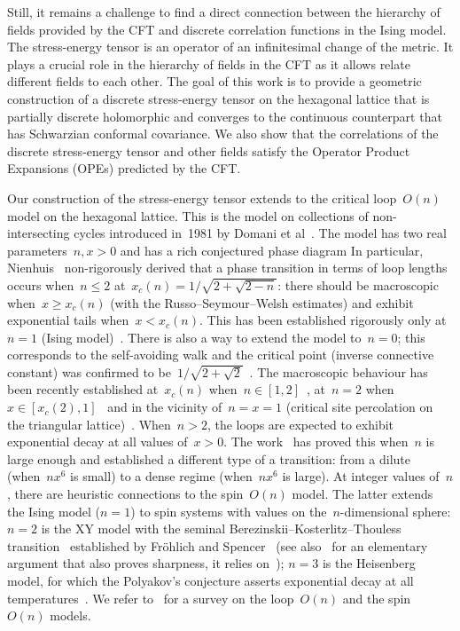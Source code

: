 \documentclass[reqno,11pt,a4paper]{amsart}
\theoremstyle{remark}
\begin{document}
Still, it remains a challenge to find a direct connection between the hierarchy of fields provided by the CFT and discrete correlation functions in the Ising model. The stress-energy tensor is an operator of an infinitesimal change of the metric. It plays a crucial role in the hierarchy of fields in the CFT as it allows relate different fields to each other. The goal of this work is to provide a geometric construction of a discrete stress-energy tensor on the hexagonal lattice that is partially discrete holomorphic and converges to the continuous counterpart that has Schwarzian conformal covariance. We also show that the correlations of the discrete stress-energy tensor and other fields satisfy the Operator Product Expansions (OPEs) predicted by the CFT.

Our construction of the stress-energy tensor extends to the critical loop~$O(n)$ model on the hexagonal lattice.
This is the model on collections of non-intersecting cycles introduced in~1981 by Domani et al~\cite{DomMukNie81}.
The model has two real parameters~$n,x>0$ and has a rich conjectured phase diagram 
In particular, Nienhuis~\cite{Nie82} non-rigorously derived that a phase transition in terms of loop lengths occurs when~$n\leq 2$ at~$x_c(n) =1/\sqrt{2+\sqrt{2-n}}$: there should be macroscopic when~$x\geq x_c(n)$ (with the Russo--Seymour--Welsh estimates) and exhibit exponential tails when~$x<x_c(n)$.
This has been established rigorously only at~$n=1$ (Ising model)~\cite{AizBarFer87,Tas16}.
There is also a way to extend the model to~$n=0$; this corresponds to the self-avoiding walk and the critical point (inverse connective constant) was confirmed to be~$1/\sqrt{2+\sqrt{2}}$~\cite{DumSmi12}.
The macroscopic behaviour has been recently established at~$x_c(n)$ when~$n\in [1,2]$~\cite{DumGlaPel21}, at~$n=2$ when~$x\in [x_c(2),1]$~\cite{GlaMan21,GlaLam23} and in the vicinity of~$n=x=1$ (critical site percolation on the triangular lattice)~\cite{CraGlaHarPel20}.
When~$n>2$, the loops are expected to exhibit exponential decay at all values of~$x>0$.
The work~\cite{DumPelSamSpi17} has proved this when~$n$ is large enough and established a different type of a transition: from a dilute (when~$nx^6$ is small) to a dense regime (when~$nx^6$ is large).
At integer values of~$n$, there are heuristic connections to the spin~$O(n)$ model.
The latter extends the Ising model ($n=1$) to spin systems with values on the~$n$-dimensional sphere: $n=2$ is the XY model with the seminal Berezinskii--Kosterlitz--Thouless transition~\cite{Ber71,KosTho72} established by Fröhlich and Spencer~\cite{FroSpe81} (see also~\cite{LisEng23} for an elementary argument that also proves sharpness, it relies on~\cite{Lam21});
$n=3$ is the Heisenberg model, for which the Polyakov's conjecture asserts exponential decay at all temperatures~\cite{Pol75}.
We refer to~\cite{PelSpi17} for a survey on the loop~$O(n)$ and the spin~$O(n)$ models.
\end{document}
